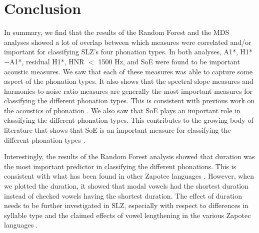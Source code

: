 \section{Conclusion} \label{sec:dt_conclusion}


In summary, we find that the results of the Random Forest and the MDS analyses showed a lot of overlap between which measures were correlated and/or important for classifying SLZ's four phonation types. In both analyses, A1*, H1*$-$A1*, residual H1*, HNR $<$ 1500 Hz, and SoE were found to be important acoustic measures. We saw that each of these measures was able to capture some aspect of the phonation types. It also shows that the spectral slope measures and harmonics-to-noise ratio measures are generally the most important measures for classifying the different phonation types. This is consistent with previous work on the acoustics of phonation \citep[e.g.,][]{garellekPhoneticsVoice2019}. We also saw that SoE plays an important role in classifying the different phonation types. This contributes to the growing body of literature that shows that SoE is an important measure for classifying the different phonation types \citep{chaiPhoneticsGlottalizedPhonations2023,garellekVoicingGlottalConsonants2021,wellerInteractionsToneGlottalization2023,wellerLexicalToneVowel2023,wellerVoiceQualityTone2024}.

Interestingly, the results of the Random Forest analysis showed that duration was the most important predictor in classifying the different phonations. This is consistent with what has been found in other Zapotec languages \citep[e.g.,][]{barzilaiContextdependentPhoneticEnhancement2021,chaiPerceptionCheckedRearticulated2025,chavez-peonInteractionMetricalStructure2010}. However, when we plotted the duration, it showed that modal vowels had the shortest duration instead of checked vowels having the shortest duration. The effect of duration needs to be further investigated in SLZ, especially with respect to differences in syllable type and the claimed effects of vowel lengthening in the various Zapotec languages \citep[e.g.,][]{chavez-peonInteractionMetricalStructure2010,merrillTilquiapanZapotec2008,nellisFortisLenisCajonos1980,pickettIsthmusJuchitanZapotec2010,uchiharaFortisLenisGlides2016}.




